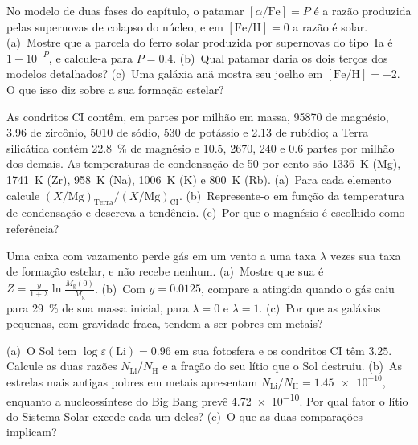\begin{exercise}[$\star\star$]\label{exo:b3:origin-of-elements:9}
No modelo de duas fases do capítulo, o patamar
$[\alpha/\mathrm{Fe}] = P$ é a razão produzida pelas supernovas de colapso do núcleo,
e em $[\mathrm{Fe/H}] = 0$ a razão é solar. (a)~Mostre que a parcela do ferro
solar produzida por supernovas do tipo~Ia é $1 - 10^{-P}$, e
calcule-a para $P = 0.4$. (b)~Qual patamar daria os dois terços dos
modelos detalhados? (c)~Uma galáxia anã mostra seu joelho em
$[\mathrm{Fe/H}] = -2$. O que isso diz sobre a sua formação estelar?
\end{exercise}

\begin{exercise}[$\star\star\star$]\label{exo:b3:origin-of-elements:10}
As condritos CI contêm, em partes por milhão em massa, \num{95870}
de magnésio, \num{3.96} de zircônio, \num{5010} de sódio, \num{530}
de potássio e \num{2.13} de rubídio; a Terra silicática contém
\qty{22.8}{\percent} de magnésio e \num{10.5}, \num{2670}, \num{240}
e \num{0.6} partes por milhão dos demais. As temperaturas de condensação de 50 por cento
são \qty{1336}{K} (Mg), \qty{1741}{K} (Zr),
\qty{958}{K} (Na), \qty{1006}{K} (K) e \qty{800}{K} (Rb). (a)~Para
cada elemento calcule $(X/\mathrm{Mg})_\mathrm{Terra}/(X/\mathrm{Mg})_\mathrm{CI}$.
(b)~Represente-o em função da temperatura de condensação e descreva a
tendência. (c)~Por que o magnésio é escolhido como referência?
\end{exercise}

\begin{exercise}[$\star\star\star$]\label{exo:b3:origin-of-elements:11}
Uma caixa com vazamento perde gás em um vento a uma taxa $\lambda$ vezes
sua taxa de formação estelar, e não recebe nenhum. (a)~Mostre que sua  é
$Z = \frac{y}{1 + \lambda}\ln\frac{M_\mathrm{g}(0)}{M_\mathrm{g}}$.
(b)~Com $y = 0.0125$, compare a  atingida quando o gás caiu
para \qty{29}{\percent} de sua massa inicial, para $\lambda = 0$ e
$\lambda = 1$. (c)~Por que as galáxias pequenas, com gravidade fraca, tendem a
ser pobres em metais?
\end{exercise}

\begin{exercise}[$\star\star\star$]\label{exo:b3:origin-of-elements:12}
(a)~O Sol tem $\log\varepsilon(\mathrm{Li}) = 0.96$ em sua fotosfera
e os condritos CI têm $3.25$. Calcule as duas razões $N_\mathrm{Li}/N_\mathrm{H}$
e a fração do seu lítio que o Sol destruiu. (b)~As estrelas mais antigas pobres em metais
apresentam $N_\mathrm{Li}/N_\mathrm{H} = \num{1.45e-10}$,
enquanto a nucleossíntese do Big Bang prevê \num{4.72e-10}. Por qual fator
o lítio do Sistema Solar excede cada um deles? (c)~O que as duas
comparações implicam?
\end{exercise}

